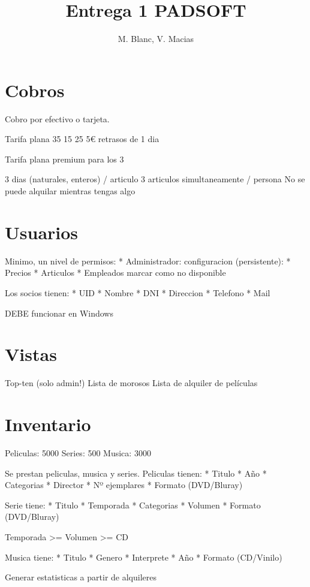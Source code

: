 \documentclass[12pt,a4paper,article]{memoir} %
\title{Entrega 1 PADSOFT}
\author{M. Blanc, V. Macias}
\date{} %
\begin{document}
\maketitle
\tableofcontents* %

\chapter{Cobros}

Cobro por efectivo o tarjeta.

Tarifa plana
35
15
25
5€ retrasos de 1 dia

Tarifa plana premium para los 3

3 dias (naturales, enteros) / articulo
3 articulos simultaneamente / persona
No se puede alquilar mientras tengas algo

\chapter{Usuarios}
Minimo, un nivel de permisos: 
* Administrador: configuracion (persistente):
* Precios
* Articulos
* Empleados marcar como no disponible

Los socios tienen:
* UID
* Nombre
* DNI
* Direccion
* Telefono
* Mail

DEBE funcionar en Windows

\chapter{Vistas}
Top-ten (solo admin!)
Lista de morosos
Lista de alquiler de películas

\chapter{Inventario}

Peliculas:  5000
Series:     500
Musica:     3000

Se prestan peliculas, musica y series.
Peliculas tienen:
* Titulo
* Año
* Categorias
* Director
* Nº ejemplares
* Formato (DVD/Bluray)

Serie tiene:
* Titulo
* Temporada
* Categorias
* Volumen
* Formato (DVD/Bluray)

Temporada >= Volumen >= CD

Musica tiene:
* Titulo
* Genero
* Interprete
* Año
* Formato (CD/Vinilo)

Generar estatisticas a partir de alquileres
\end{document}
